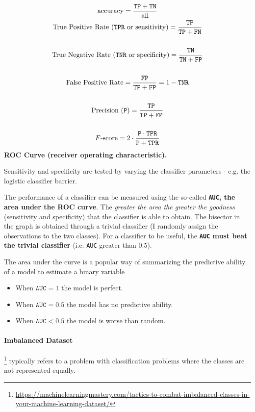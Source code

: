\begin{gather*}
    \text{accuracy} =\frac{\texttt{TP}+\texttt{TN}}{\text{all}}\\
    \text{True Positive Rate (\texttt{TPR} or sensitivity)} =\frac{\texttt{TP}}{\texttt{TP}+\texttt{FN}}\\
    \\
    \text{True Negative Rate (\texttt{TNR} or specificity)} =\frac{\texttt{TN}}{\texttt{TN}+\texttt{FP}}\\
    \\
    \text{False Positive Rate} =\frac{\texttt{FP}}{\texttt{TP}+\texttt{FP}} = 1 - \texttt{TNR}\\
    \\
    \text{Precision (\texttt{P})} = \frac{\texttt{TP}}{\texttt{TP}+\texttt{FP}}\\
    \\
    F\text{-score} = 2 \cdot \frac{\texttt{P} \cdot \texttt{TPR}}{\texttt{P} + \texttt{TPR}}
\end{gather*}
\textbf{ROC Curve (receiver operating characteristic).}

Sensitivity and specificity are tested by varying the classifier parameters - e.g. the logistic classifier barrier.


The performance of a classifier can be measured using the so-called \textbf{\texttt{AUC}, the area under the ROC curve}. The \textit{greater the area the greater the goodness} (sensitivity and specificity) that the classifier is able to obtain. The bisector in the graph is obtained through a trivial classifier (I randomly assign the observations to the two classes). For a classifier to be useful, the \textbf{\texttt{AUC} must beat the trivial classifier} (i.e. \texttt{AUC} greater than 0.5).

The area under the curve is a popular way of summarizing the predictive ability of a model to estimate a binary variable
\begin{itemize}
    \item When $\texttt{AUC} = 1$ the model is perfect. 
    \item When $\texttt{AUC} = 0.5$ the model has no predictive ability.
    \item When $\texttt{AUC} < 0.5$ the model is worse than random.
\end{itemize}

\paragraph{Imbalanced Dataset}\footnote{\url{https://machinelearningmastery.com/tactics-to-combat-imbalanced-classes-in-your-machine-learning-dataset/}} typically refers to a problem with classification problems where the classes are not represented equally.

